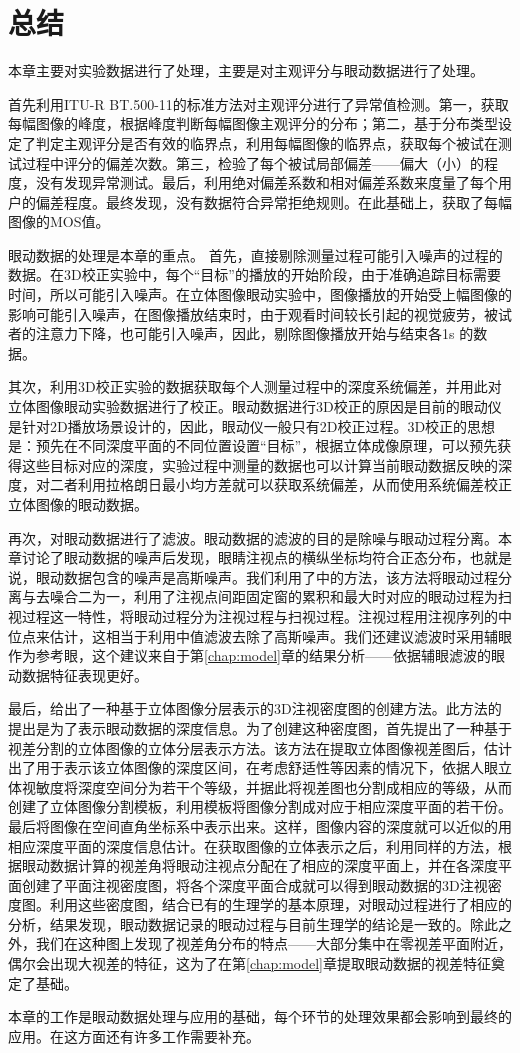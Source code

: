 \section{总结}
\label{sec:conclusionchapter4}
本章主要对实验数据进行了处理，主要是对主观评分与眼动数据进行了处理。

首先利用ITU-R BT.500-11的标准方法对主观评分进行了异常值检测。第一，获取每幅图像的峰度，根据峰度判断每幅图像主观评分的分布；第二，基于分布类型设定了判定主观评分是否有效的临界点，利用每幅图像的临界点，获取每个被试在测试过程中评分的偏差次数。第三，检验了每个被试局部偏差——偏大（小）的程度，没有发现异常测试。最后，利用绝对偏差系数和相对偏差系数来度量了每个用户的偏差程度。最终发现，没有数据符合异常拒绝规则。在此基础上，获取了每幅图像的MOS值。

眼动数据的处理是本章的重点。
首先，直接剔除测量过程可能引入噪声的过程的数据。在3D校正实验中，每个“目标”的播放的开始阶段，由于准确追踪目标需要时间，所以可能引入噪声。在立体图像眼动实验中，图像播放的开始受上幅图像的影响可能引入噪声，在图像播放结束时，由于观看时间较长引起的视觉疲劳，被试者的注意力下降，也可能引入噪声，因此，剔除图像播放开始与结束各1s 的数据。

其次，利用3D校正实验的数据获取每个人测量过程中的深度系统偏差，并用此对立体图像眼动实验数据进行了校正。眼动数据进行3D校正的原因是目前的眼动仪是针对2D播放场景设计的，因此，眼动仪一般只有2D校正过程。3D校正的思想是：预先在不同深度平面的不同位置设置“目标”，根据立体成像原理，可以预先获得这些目标对应的深度，实验过程中测量的数据也可以计算当前眼动数据反映的深度，对二者利用拉格朗日最小均方差就可以获取系统偏差，从而使用系统偏差校正立体图像的眼动数据。

再次，对眼动数据进行了滤波。眼动数据的滤波的目的是除噪与眼动过程分离。本章讨论了眼动数据的噪声后发现，眼睛注视点的横纵坐标均符合正态分布，也就是说，眼动数据包含的噪声是高斯噪声。我们利用了\parencite{olsson2007real}中的方法，该方法将眼动过程分离与去噪合二为一，利用了注视点间距固定窗的累积和最大时对应的眼动过程为扫视过程这一特性，将眼动过程分为注视过程与扫视过程。注视过程用注视序列的中位点来估计，这相当于利用中值滤波去除了高斯噪声。我们还建议滤波时采用辅眼作为参考眼，这个建议来自于第\ref{chap:model}章的结果分析——依据辅眼滤波的眼动数据特征表现更好。

最后，给出了一种基于立体图像分层表示的3D注视密度图的创建方法。此方法的提出是为了表示眼动数据的深度信息。为了创建这种密度图，首先提出了一种基于视差分割的立体图像的立体分层表示方法。该方法在提取立体图像视差图后，估计出了用于表示该立体图像的深度区间，在考虑舒适性等因素的情况下，依据人眼立体视敏度将深度空间分为若干个等级，并据此将视差图也分割成相应的等级，从而创建了立体图像分割模板，利用模板将图像分割成对应于相应深度平面的若干份。最后将图像在空间直角坐标系中表示出来。这样，图像内容的深度就可以近似的用相应深度平面的深度信息估计。在获取图像的立体表示之后，利用同样的方法，根据眼动数据计算的视差角将眼动注视点分配在了相应的深度平面上，并在各深度平面创建了平面注视密度图，将各个深度平面合成就可以得到眼动数据的3D注视密度图。利用这些密度图，结合已有的生理学的基本原理，对眼动过程进行了相应的分析，结果发现，眼动数据记录的眼动过程与目前生理学的结论是一致的。除此之外，我们在这种图上发现了视差角分布的特点——大部分集中在零视差平面附近，偶尔会出现大视差的特征，这为了在第\ref{chap:model}章提取眼动数据的视差特征奠定了基础。

本章的工作是眼动数据处理与应用的基础，每个环节的处理效果都会影响到最终的应用。在这方面还有许多工作需要补充。